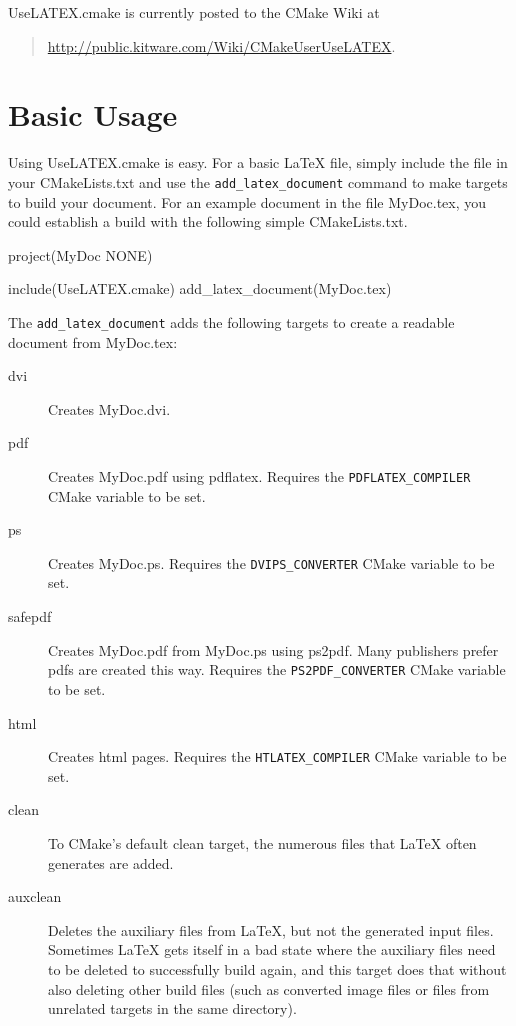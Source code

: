 \documentclass{article}
\newcommand*{\textfile}[1]{\textsf{#1}}
\newcommand*{\textprog}[1]{\textfile{#1}}
\newcommand*{\textcmake}[1]{\texttt{#1}}
\newcommand*{\textcmakevar}[1]{\textcmake{#1}}
\newcommand*{\textmaketarget}[1]{#1}
\newcommand*{\UseLATEX}{\textfile{UseLATEX.cmake}\xspace}
\newcommand*{\latex}{\LaTeX\xspace}
\newcommand*{\ald}{\textcmake{add\_latex\_document}\xspace}
\begin{document}
  \UseLATEX is currently posted to the CMake Wiki at
  \begin{quote}
    \href{http://public.kitware.com/Wiki/CMakeUserUseLATEX}{http://public.kitware.com/Wiki/CMakeUserUseLATEX}.
  \end{quote}


  \section{Basic Usage}
  \label{sec:BasicUsage}

  Using \UseLATEX is easy. For a basic \latex file, simply include the file
  in your \textfile{CMakeLists.txt} and use the \ald command to make
  targets to build your document. For an example document in the file
  \textfile{MyDoc.tex}, you could establish a build with the following
  simple \textfile{CMakeLists.txt}.

  \begin{CodeListing}
project(MyDoc NONE)

include(UseLATEX.cmake)
add_latex_document(MyDoc.tex)
  \end{CodeListing}

  The \ald adds the following targets to create a readable document from
  \textfile{MyDoc.tex}:

  \begin{description}
    \item[\textmaketarget{dvi}] Creates \textfile{MyDoc.dvi}.
    \item[\textmaketarget{pdf}] Creates \textfile{MyDoc.pdf} using
      \textprog{pdflatex}. Requires the \textcmakevar{PDFLATEX\_COMPILER}
      CMake variable to be set.
    \item[\textmaketarget{ps}] Creates \textfile{MyDoc.ps}. Requires the
      \textcmakevar{DVIPS\_CONVERTER} CMake variable to be set.
    \item[\textmaketarget{safepdf}] Creates \textfile{MyDoc.pdf} from
      \textfile{MyDoc.ps} using \textprog{ps2pdf}. Many publishers prefer
      pdfs are created this way. Requires the
      \textcmakevar{PS2PDF\_CONVERTER} CMake variable to be set.
    \item[\textmaketarget{html}] Creates html pages. Requires the
      \textcmakevar{HTLATEX\_COMPILER} CMake variable to be set.
    \item[\textmaketarget{clean}] To CMake's default \textmaketarget{clean}
      target, the numerous files that \latex often generates are added.
    \item[\textmaketarget{auxclean}] Deletes the auxiliary files from
      \latex, but not the generated input files.  Sometimes \latex gets
      itself in a bad state where the auxiliary files need to be deleted to
      successfully build again, and this target does that without also
      deleting other build files (such as converted image files or files
      from unrelated targets in the same directory).
  \end{description}
\end{document}
